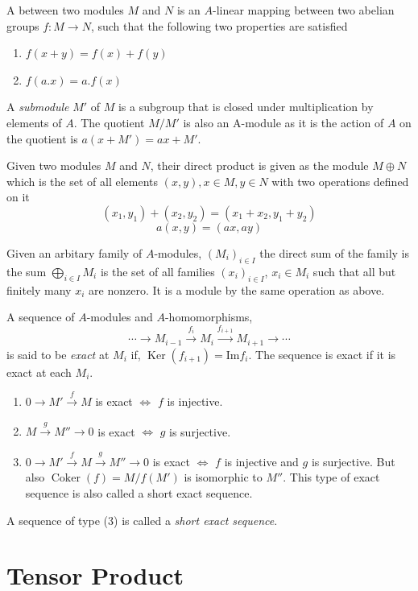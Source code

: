 \documentclass[]{report}
\DeclareMathOperator\Ker{Ker}
\DeclareMathOperator\Coker{Coker}
\begin{document}
A  between two modules $M$ and $N$ is an $A$-linear mapping between two abelian groups $f:M\rightarrow N$, such that the following two properties are satisfied
\begin{enumerate}
    \item $f(x+y) = f(x) + f(y)$
    \item $f(a.x) = a.f(x)$
\end{enumerate}

A \textit{submodule} $M'$ of $M$ is a subgroup that is closed under multiplication by elements of $A$. The quotient $M/M'$ is also an A-module as it is the action of $A$ on the quotient is $a(x + M') = ax + M'$.

Given two modules $M$ and $N$, their direct product is given as the module $M\oplus N$ which is the set of all elements $(x,y), x\in M, y\in N$ with two operations defined on it
$$(x_1,y_1) + (x_2,y_2) = (x_1+x_2, y_1+y_2)$$
$$a(x,y) = (ax, ay)$$

Given an arbitary family of $A$-modules, $(M_i)_{i\in I}$ the direct sum of the family is the sum $\bigoplus_{i\in I} M_i$ is the set of all families $(x_i)_{i\in I}$, $x_i\in M_i$ such that all but finitely many $x_i$ are nonzero. It is a module by the same operation as above. 

A sequence of $A$-modules and $A$-homomorphisms,
$$\cdots \rightarrow M_{i-1} \xrightarrow{f_i} M_i \xrightarrow{f_{i+1}} M_{i+1} \rightarrow \cdots$$ 
is said to be \textit{exact} at $M_i$ if, $\Ker(f_{i+1}) = \text{Im}{f_i}$. The sequence is exact if it is exact at each $M_i$. 

\begin{enumerate}
    \item $0 \rightarrow M' \xrightarrow{f} M$ is exact $\Leftrightarrow$ $f$ is injective.
    \item $M \xrightarrow{g} M'' \rightarrow 0$ is exact $\Leftrightarrow$ $g$ is surjective. 
    \item $0 \rightarrow M' \xrightarrow{f} M \xrightarrow{g} M'' \rightarrow 0$ is exact $\Leftrightarrow$ $f$ is injective and $g$ is surjective. But also $\Coker(f) = M/f(M')$ is isomorphic to $M''$. This type of exact sequence is also called a short exact sequence. 
\end{enumerate}

A sequence of type (3) is called a \textit{short exact sequence}.

\section{Tensor Product}
\end{document}
